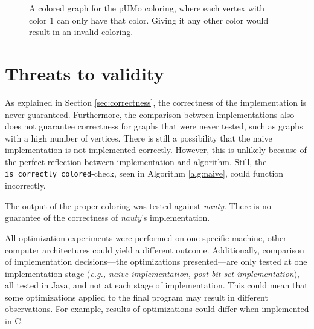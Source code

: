 \documentclass{article}
\begin{document}
\begin{figure}
	\begin{center}
	\end{center}
	\caption{A colored graph for the $\mathrm{pUMo}$ coloring, where each vertex with color $1$ can only have that color. Giving it any other color would result in an invalid coloring.}\label{fig:graph}
\end{figure}


\section{Threats to validity}
\label{sec:threats}

As explained in Section \ref{sec:correctness}, the correctness of the implementation is never guaranteed. Furthermore, the comparison between implementations also does not guarantee correctness for graphs that were never tested, such as graphs with a high number of vertices. 
There is still a possibility that the naive implementation is not implemented correctly. However, this is unlikely because of the perfect reflection between implementation and algorithm. Still, the \texttt{is\_correctly\_colored}-check, seen in Algorithm \ref{alg:naive}, could function incorrectly.

The output of the proper coloring was tested against \textit{nauty}. There is no guarantee of the correctness of \textit{nauty}'s implementation.

All optimization experiments were performed on one specific machine, other computer architectures could yield a different outcome. 
Additionally, comparison of implementation decisions---the optimizations presented---are only tested at one implementation stage (\textit{e.g., naive implementation, post-bit-set implementation}), all tested in Java, and not at each stage of implementation. This could mean that some optimizations applied to the final program may result in different observations. For example, results of optimizations could differ when implemented in C.
\end{document}
